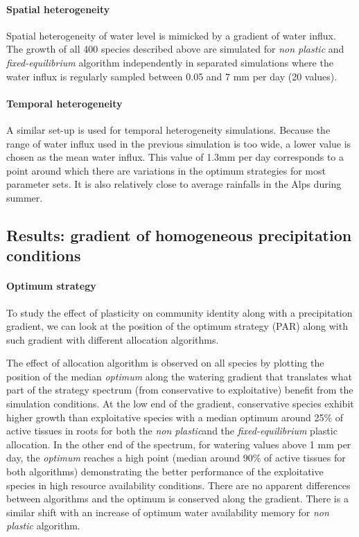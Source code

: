 \paragraph{Spatial heterogeneity}
Spatial heterogeneity of water level is mimicked by a gradient of water influx. The growth of all 400 species described above are simulated for \textit{non plastic} and \textit{fixed-equilibrium} algorithm independently in separated simulations where the water influx is regularly sampled between 0.05 and 7 mm per day (20 values).

\paragraph{Temporal heterogeneity}
A similar set-up is used for temporal heterogeneity simulations. Because the range of water influx used in the previous simulation is too wide, a lower value is chosen as the mean water influx. This value of 1.3mm per day corresponds to a point around which there are variations in the optimum strategies for most parameter sets. It is also relatively close to average rainfalls in the Alps during summer. 

\subsection{Results: gradient of homogeneous precipitation conditions}

\paragraph{Optimum strategy}

To study the effect of plasticity on community identity along with a precipitation gradient, we can look at the position of the optimum strategy (PAR) along with such gradient with different allocation algorithms.


The effect of allocation algorithm is observed on all species by plotting the position of the median \textit{optimum} along the watering gradient that translates what part of the strategy spectrum (from conservative to exploitative) benefit from the simulation conditions. At the low end of the gradient, conservative species exhibit higher growth than exploitative species with a median optimum around 25\% of active tissues in roots for both the \textit{non plastic}and the \textit{fixed-equilibrium} plastic allocation. In the other end of the spectrum, for watering values above 1 mm per day, the \textit{optimum} reaches a high point (median around 90\% of active tissues for both algorithms) demonstrating the better performance of the exploitative species in high resource availability conditions.  There are no apparent differences between algorithms and the optimum is conserved along the gradient. There is a similar shift with an increase of optimum water availability memory for \textit{non plastic} algorithm.


